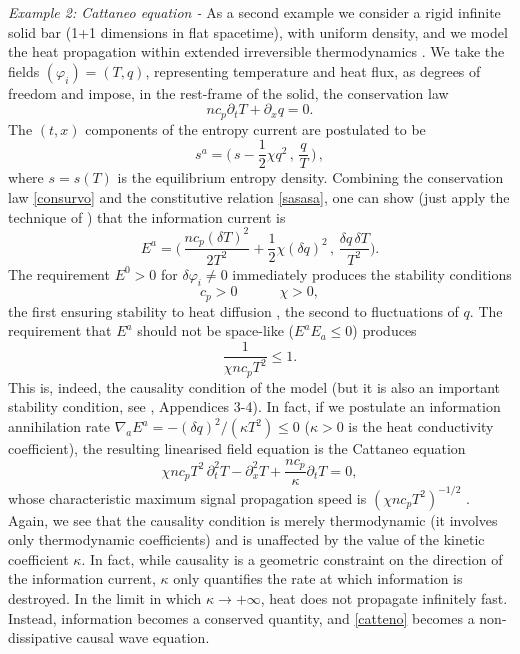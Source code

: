 \documentclass[aps,prl,reprint,nofootinbib]{revtex4-1}
\newcommand{\spc}{\quad \quad \quad}
\begin{document}
\textit{Example 2: Cattaneo equation -} As a second example we consider a rigid infinite solid bar (1+1 dimensions in flat spacetime), with uniform density, and we model the heat propagation within extended irreversible thermodynamics \cite{Jou_Extended,GavassinoUEIT2021}. We take the fields $(\varphi_i)=(T,q)$, representing temperature and heat flux, as degrees of freedom and impose, in the rest-frame of the solid, the conservation law
\begin{equation}\label{consurvo}
n c_p \partial_t T + \partial_x q =0. 
\end{equation}
The $(t,x)$ components of the entropy current are postulated to be
\begin{equation}\label{sasasa}
s^a = \bigg( \, s - \dfrac{1}{2} \chi q^2 \, , \, \dfrac{q}{T} \, \bigg) \, , 
\end{equation}
where $s=s(T)$ is the equilibrium entropy density. Combining the conservation law \eqref{consurvo} and the constitutive relation \eqref{sasasa}, one can show (just apply the technique of \cite{GavassinoGibbs2021}) that the information current is
\begin{equation}\label{EAAAAA}
E^a = \bigg( \, \dfrac{nc_p (\delta T)^2}{2T^2} + \frac{1}{2}  \chi (\delta q)^2 \, , \, \dfrac{\delta q \, \delta T}{T^2} \bigg).
\end{equation}
The requirement $E^0 > 0$ for $\delta \varphi_i \neq 0$ immediately produces the stability conditions
\begin{equation}
c_p > 0  \spc \chi > 0,
\end{equation}
the first ensuring stability to heat diffusion \cite{PrigoginebookModernThermodynamics2014}, the second to fluctuations of $q$. The requirement that $E^a$ should not be space-like ($E^a E_a \leq 0$) produces 
\begin{equation}
\dfrac{1}{\chi n c_p T^2} \leq 1.
\end{equation}
This is, indeed, the causality condition of the model (but it is also an important stability condition, see \cite{GavassinoLyapunov_2020}, Appendices 3-4). In fact, if we postulate an information annihilation rate $\nabla_a E^a = - (\delta q)^2/(\kappa T^2) \leq 0$ ($\kappa>0$ is the heat conductivity coefficient), the resulting linearised field equation is the Cattaneo equation
\begin{equation}\label{catteno}
\chi n c_p T^2 \, \partial_t^2   T - \partial_x^2  T + \dfrac{n c_p}{\kappa} \partial_t  T =0,
\end{equation}
whose characteristic maximum signal propagation speed is $(\chi n c_p T^2)^{-1/2}$ \cite{Kost2000}. Again, we see that the causality condition is merely thermodynamic (it involves only thermodynamic coefficients) and is unaffected by the value of the kinetic coefficient $\kappa$. In fact, while causality is a geometric constraint on the direction of the information current, $\kappa$ only quantifies the rate at which information is destroyed. In the limit in which $\kappa \rightarrow +\infty$, heat does not propagate infinitely fast. Instead, information becomes a conserved quantity, and \eqref{catteno} becomes a non-dissipative causal wave equation.
\end{document}
